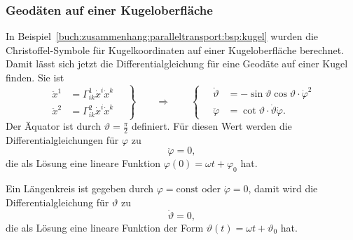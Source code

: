 \subsubsection{Geodäten auf einer Kugeloberfläche}
In Beispiel~\ref{buch:zusammenhang:paralleltransport:bsp:kugel}
wurden die Christoffel-Symbole für Kugelkoordinaten auf einer
Kugeloberfläche berechnet.
%
Damit lässt sich jetzt die Differentialgleichung für eine Geodäte auf
einer Kugel finden.
Sie ist
\begin{equation}
\left.
\begin{aligned}
\ddot{x}^1 &= \Gamma^1_{ik}\dot{x}^i\dot{x}^k
\\
\ddot{x}^2 &= \Gamma^2_{ik}\dot{x}^i\dot{x}^k
\end{aligned}
\quad
\right\}
\qquad\Rightarrow\qquad
\left\{
\quad
\begin{aligned}
\ddot{\vartheta}
&=
-\sin\vartheta\cos\vartheta \cdot \dot{\varphi}^2
\\
\ddot{\varphi}
&=
\cot\vartheta \cdot \dot{\vartheta}\dot{\varphi}.
\end{aligned}
\right.
\label{buch:zusammenhang:geodaeten:kugeldgl}
\end{equation}
Der Äquator ist durch $\vartheta=\frac{\pi}2$ definiert.
Für diesen Wert werden die Differentialgleichungen für $\varphi$ zu
\[
\ddot{\varphi}=0,
\]
die als Lösung eine lineare Funktion
$\varphi(0)=\omega t +\varphi_0$ hat.

Ein Längenkreis ist gegeben durch $\varphi=\text{const}$ oder
$\dot{\varphi}=0$, damit wird die Differentialgleichung für $\vartheta$
zu
\[
\ddot{\vartheta} = 0,
\]
die als Lösung eine lineare Funktion der Form
$\vartheta(t) = \omega t + \vartheta_0$ hat.


